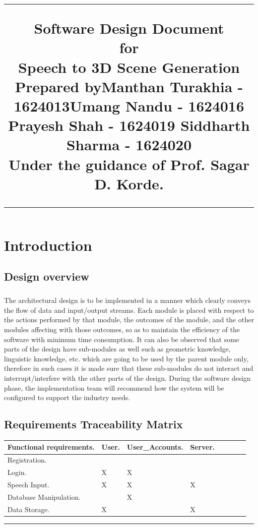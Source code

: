 \documentclass[12pt,a4paper,final,oneside]{report}
\title{%
\flushright
\rule{16cm}{5pt}\vskip1cm
\Huge{Software Design Document }\\
\vspace{0.1cm}
for\\
\vspace{0.1cm}
Speech to 3D Scene Generation\\
\vspace{0.5cm}
Prepared by\linebreak Manthan Turakhia - 1624013\linebreak Umang Nandu - 1624016 \linebreak Prayesh Shah - 1624019 \linebreak Siddharth Sharma - 1624020\\
Under the guidance of \linebreak Prof. Sagar D. Korde.\\
\vfill
\rule{16cm}{5pt}
}
\date{}
\begin{document}
\maketitle
\tableofcontents
\chapter{Introduction}
\section{Design overview}
\paragraph{}The architectural design is to be implemented in a manner which clearly conveys the flow of data and input/output streams. Each module is placed with respect to the actions performed by that module, the outcomes of the module, and the other modules affecting with those outcomes, so as to maintain the efficiency of the software with minimum time consumption.
It can also be observed that some parts of the design have sub-modules as well such as geometric knowledge, linguistic knowledge, etc. which are going to be used by the parent module only, therefore in such cases it is made sure that these sub-modules do not interact and interrupt/interfere with the other parts of the design. During the software design phase, the implementation team will recommend how the system will be configured to support the industry needs.

\section{Requirements Traceability Matrix}
  \begin{center}
\begin{table}[h!]
  \centering


  \begin{tabular}{|p{3cm}| p{0.7cm} | p{1cm} | p{1cm}| p{1.8cm}| p{1.5cm}| p{1.5cm}| p{1.7cm}|}
\hline
    Functional requirements. & User.& User_Accounts.&Server.\\
    \hline
    Registration. &&&\\
    \hline
    Login. &X&X&\\
 \hline
    Speech Input. &X&X&X\\
 \hline
    Database Manipulation.&&X&\\
 \hline
    Data Storage.&X&&X\\
 \hline

  \end{tabular}
\end{table}
\end{center}
\rule{16cm}{5pt}
\end{document}
